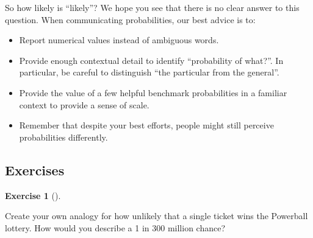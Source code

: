 \documentclass[
  letterpaper,
  DIV=11,
  numbers=noendperiod]{scrreprt}
\providecommand{\tightlist}{%
  \setlength{\itemsep}{0pt}\setlength{\parskip}{0pt}}
\theoremstyle{plain}
\theoremstyle{definition}
\theoremstyle{definition}
\newtheorem{exercise}{Exercise}[chapter]
\theoremstyle{definition}
\theoremstyle{remark}
\begin{document}
So how likely is ``likely''? We hope you see that there is no clear
answer to this question. When communicating probabilities, our best
advice is to:

\begin{itemize}
\tightlist
\item
  Report numerical values instead of ambiguous words.
\item
  Provide enough contextual detail to identify ``probability of what?''.
  In particular, be careful to distinguish ``the particular from the
  general''.
\item
  Provide the value of a few helpful benchmark probabilities in a
  familiar context to provide a sense of scale.
\item
  Remember that despite your best efforts, people might still perceive
  probabilities differently.
\end{itemize}

\subsection{Exercises}\label{exercises-5}

\begin{exercise}[]\protect\hypertarget{exr-powerball-analogy}{}\label{exr-powerball-analogy}

Create your own analogy for how unlikely that a single ticket wins the
Powerball lottery. How would you describe a 1 in 300 million chance?

\end{exercise}
\end{document}
